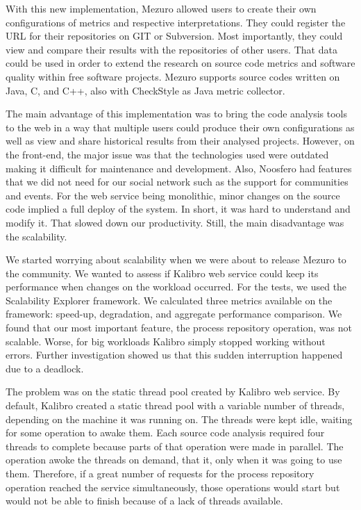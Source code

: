 With this new implementation, Mezuro allowed users to create their own
configurations of metrics and respective interpretations. They could register
the URL for their repositories on GIT or Subversion. Most importantly, they
could view and compare their results with the repositories of other users. That
data could be used in order to extend the research on source code metrics and
software quality within free software projects. Mezuro supports source codes
written on Java, C, and C++, also with CheckStyle as Java metric collector.

The main advantage of this implementation was to bring the code analysis tools
to the web in a way that multiple users could produce their own configurations
as well as view and share historical results from their analysed projects.
However, on the front-end, the major issue was that the technologies used were
outdated making it difficult for maintenance and development. Also, Noosfero
had features that we did not need for our social network such as the support
for communities and events. For the web service being monolithic, minor changes
on the source code implied a full deploy of the system. In short, it was hard to
understand and modify it. That slowed down our productivity. Still, the main
disadvantage was the scalability.

We started worrying about scalability when we were about to release Mezuro to
the community. We wanted to assess if Kalibro web service could keep its
performance when changes on the workload occurred. For the tests, we used the
Scalability Explorer\cite{moura2013automated} framework. We calculated three
metrics available on the framework: speed-up, degradation, and aggregate
performance comparison\cite{li2012catalogue}. We found that our most important
feature, the process repository operation, was not scalable. Worse, for big
workloads Kalibro simply stopped working without errors. Further investigation
showed us that this sudden interruption happened due to a deadlock.

The problem was on the static thread pool created by Kalibro web service. By
default, Kalibro created a static thread pool with a variable number of
threads, depending on the machine it was running on. The threads were kept
idle, waiting for some operation to awake them. Each source code analysis
required four threads to complete because parts of that operation were made in
parallel. The operation awoke the threads on demand, that it, only when it was
going to use them. Therefore, if a great number of requests for the process
repository operation reached the service simultaneously, those operations would
start but would not be able to finish because of a lack of threads available.

